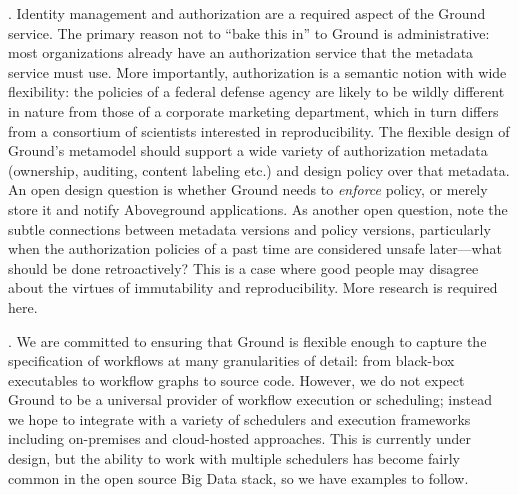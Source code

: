 \documentclass{sig-alternate}
\begin{document}
.  Identity management and authorization are a required aspect of the Ground service.  The primary reason not to ``bake this in'' to Ground is administrative: most organizations already have an authorization service that the metadata service must use.  More importantly, authorization is a semantic notion with wide flexibility: the policies of a federal defense agency are likely to be wildly different in nature from those of a corporate marketing department, which in turn differs from a consortium of scientists interested in reproducibility.  The flexible design of Ground's metamodel should support a wide variety of authorization metadata (ownership, auditing, content labeling etc.) and design policy over that metadata.  An open design question is whether Ground needs to \emph{enforce} policy, or merely store it and notify Aboveground applications.  As another open question, note the subtle connections between metadata versions and policy versions, particularly when the authorization policies of a past time are considered unsafe later---what should be done retroactively? This is a case where good people may disagree about the virtues of immutability and reproducibility. More research is required here.


. We are committed to ensuring that Ground is flexible enough to capture the specification of workflows at many granularities of detail: from black-box executables to workflow graphs to source code.  However, we do not expect Ground to be a universal provider of workflow execution or scheduling; instead we hope to integrate with a variety of schedulers and execution frameworks including on-premises and cloud-hosted approaches. This is currently under design, but the ability to work with multiple schedulers has become fairly common in the open source Big Data stack, so we have examples to follow.
\end{document}
